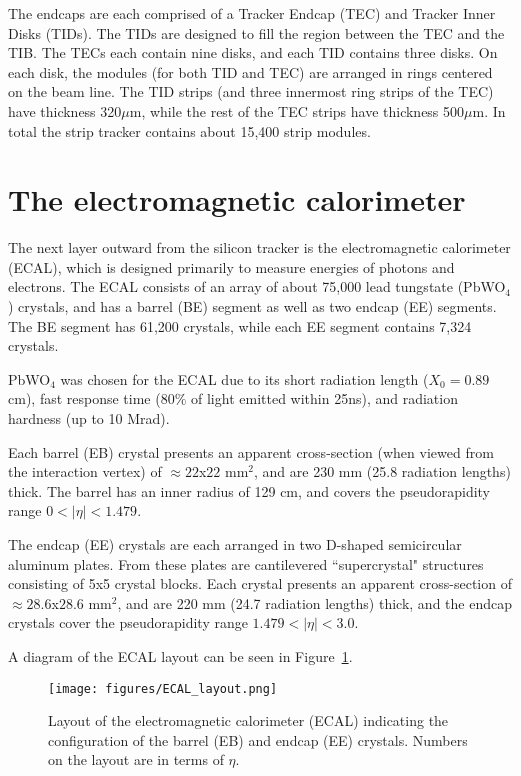 The endcaps are each comprised of a Tracker Endcap (TEC) and Tracker Inner Disks (TIDs). The TIDs are designed to fill the region between the TEC and the TIB. The TECs each contain nine disks, and each TID contains three disks. On each disk, the modules (for both TID and TEC) are arranged in rings centered on the beam line. The TID strips (and three innermost ring strips of the TEC) have thickness 320$\mu$m, while the rest of the TEC strips have thickness 500$\mu$m. In total the strip tracker contains about 15,400 strip modules.\cite{TDR}



\section{The electromagnetic calorimeter}

The next layer outward from the silicon tracker is the electromagnetic calorimeter (ECAL), which is designed primarily to measure energies of photons and electrons. The ECAL consists of an array of about 75,000 lead tungstate (PbWO$_4$) crystals, and has a barrel (BE) segment as well as two endcap (EE) segments. The BE segment has 61,200 crystals, while each EE segment contains 7,324 crystals.

PbWO$_4$ was chosen for the ECAL due to its short radiation length ($X_0 = 0.89$ cm), fast response time ($80\%$ of light emitted within 25ns), and radiation hardness (up to 10 Mrad).

Each barrel (EB) crystal presents an apparent cross-section (when viewed from the interaction vertex) of $\approx 22$x$22$ mm$^2$, and are 230 mm (25.8 radiation lengths) thick. The barrel has an inner radius of 129 cm, and covers the pseudorapidity range $0 < |\eta| < 1.479$.\cite{TDR}

The endcap (EE) crystals are each arranged in two D-shaped semicircular aluminum plates. From these plates are cantilevered ``supercrystal" structures consisting of 5x5 crystal blocks. Each crystal presents an apparent cross-section of $\approx 28.6$x$28.6$ mm$^2$, and are 220 mm (24.7 radiation lengths) thick, and the endcap crystals cover the pseudorapidity range $1.479 < |\eta| < 3.0$.\cite{ECAL}

A diagram of the ECAL layout can be seen in Figure~\ref{fig:ECAL_layout}.

\begin{figure}\centering
  \texttt{[image: figures/ECAL\_layout.png]}
  \caption{\label{fig:ECAL_layout} Layout of the electromagnetic calorimeter (ECAL) indicating the configuration of the barrel (EB) and endcap (EE) crystals. Numbers on the layout are in terms of $\eta$.}
\end{figure}

